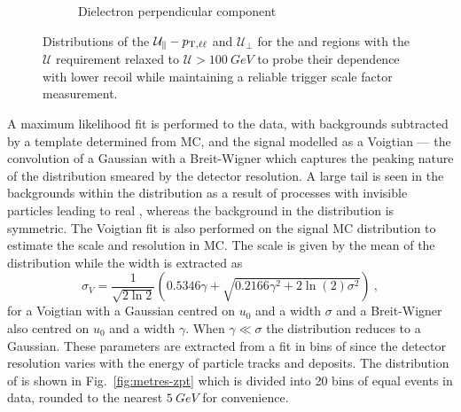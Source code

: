 \begin{figure}[htb]
\begin{subfigure}[b]{0.49\textwidth}
        \caption{Dielectron perpendicular component}
        \label{subfigd:recoil-calib-dists}
    \end{subfigure}
    \caption[Recoil distributions in dilepton final states.]{
        Distributions of the $\mathcal{U}_{\parallel}-p_{\mathrm{T},\ell\ell}$ and $\mathcal{U}_{\perp}$ for the \dimuplusjets and \dieleplusjets regions with the $\mathcal{U}$ requirement relaxed to ${\mathcal{U}>\SI{100}{GeV}}$ to probe their dependence with lower recoil while maintaining a reliable \ptmiss trigger scale factor measurement.
    }
    \label{fig:recoil-calib-dists}
\end{figure}

A maximum likelihood fit is performed to the data, with backgrounds subtracted
by a template determined from MC, and the signal modelled as a Voigtian --- the
convolution of a Gaussian with a Breit-Wigner which captures the peaking nature
of the distribution smeared by the detector resolution. A large tail is seen
in the backgrounds within the \recoilpara distribution as a result of
processes with invisible particles leading to real \ptmiss, whereas the
background in the \recoilperp distribution is symmetric. The Voigtian fit is
also performed on the signal MC distribution to estimate the scale and
resolution in MC. The scale is given by the mean of the distribution while the
width is extracted as
%
\begin{equation}
    \sigma_V = \frac{1}{\sqrt{2\ln 2}}\left(0.5346\gamma + \sqrt{0.2166\gamma^2 + 2\ln(2) \sigma^2}\right)\ ,
\end{equation}
%
for a Voigtian with a Gaussian centred on $u_0$ and a width $\sigma$ and a
Breit-Wigner also centred on $u_0$ and a width $\gamma$. When
$\gamma\ll\sigma$ the distribution reduces to a Gaussian. These parameters are
extracted from a fit in bins of \ptll since the detector resolution varies
with the energy of particle tracks and deposits. The distribution of \ptll is
shown in Fig.~\ref{fig:metres-zpt} which is divided into 20 bins of equal
events in data, rounded to the nearest ${\SI{5}{GeV}}$ for convenience.
%
